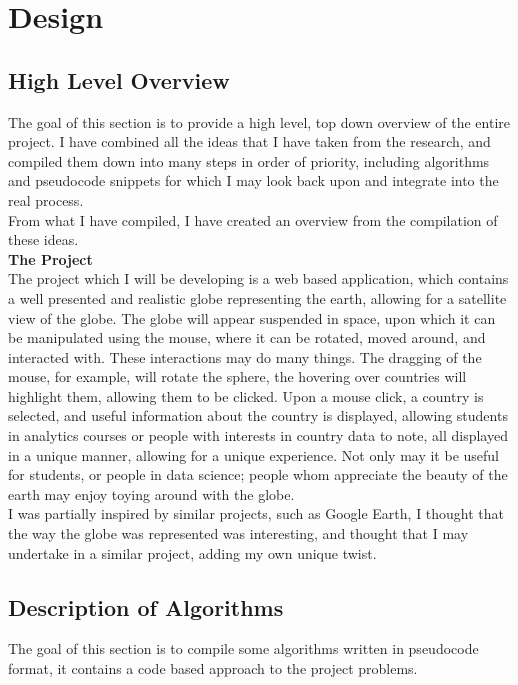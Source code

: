 \chapter{Design}

\section{High Level Overview}
The goal of this section is to provide a high level, top down overview of the entire project. I have combined all the ideas that I have taken from the research, and compiled them down into many steps in order of priority, including algorithms and pseudocode snippets for which I may look back upon and integrate into the real process. \\
From what I have compiled, I have created an overview from the compilation of these ideas. \\

\textbf{The Project} \\
The project which I will be developing is a web based application, which contains a well presented and realistic globe representing the earth, allowing for a satellite view of the globe. The globe will appear suspended in space, upon which it can be manipulated using the mouse, where it can be rotated, moved around, and interacted with. These interactions may do many things. The dragging of the mouse, for example, will rotate the sphere, the hovering over countries will highlight them, allowing them to be clicked. Upon a mouse click, a country is selected, and useful information about the country is displayed, allowing students in analytics courses or people with interests in country data to note, all displayed in a unique manner, allowing for a unique experience. Not only may it be useful for students, or people in data science; people whom appreciate the beauty of the earth may enjoy toying around with the globe. \\
I was partially inspired by similar projects, such as Google Earth, I thought that the way the globe was represented was interesting, and thought that I may undertake in a similar project, adding my own unique twist.

\section{Description of Algorithms}
The goal of this section is to compile some algorithms written in pseudocode format, it contains a code based approach to the project problems.

